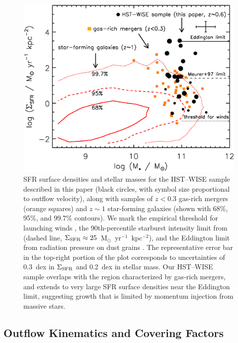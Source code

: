 \documentclass[apj]{emulateapj}
\newcommand{\units}{M$_{\odot}$~yr$^{-1}$~kpc$^{-2}$}
\newcommand{\sigmasfr}{\Sigma_{\textnormal{\scriptsize{SFR}}}}
\begin{document}
\begin{figure}[!t]
\begin{center}
\includegraphics[angle=0,scale=.8]{f4.ps} 
\caption{SFR surface densities and stellar masses for the HST--WISE
  sample described in this paper (black circles, with symbol size
  proportional to outflow velocity), along with samples of $z<0.3$
  gas-rich mergers (orange squares) and $z\sim1$ star-forming galaxies
  (shown with 68\%, 95\%, and 99.7\% contours).  We mark the empirical
  threshold for launching winds \citep[dotted line,
    $\sigmasfr\approx0.1$~\units;][]{hec02}, the 90th-percentile
  starburst intensity limit from \citet{meu97} (dashed line,
  $\sigmasfr\approx25$~\units), and the Eddington limit from radiation
  pressure on dust grains \citep[solid line,
    $\sigmasfr\approx3000$~\units;][]{mur05,tho05,hop10}.  The
  representative error bar in the top-right portion of the plot
  corresponds to uncertainties of 0.3~dex in $\sigmasfr$ and 0.2~dex
  in stellar mass.  Our HST--WISE sample overlaps with the region
  characterized by gas-rich mergers, and extends to very large SFR
  surface densities near the Eddington limit, suggesting growth that
  is limited by momentum injection from massive stars.}
\label{fig:sigmasfr}
\end{center}
\end{figure}

\subsection{Outflow Kinematics and Covering Factors}
\end{document}

